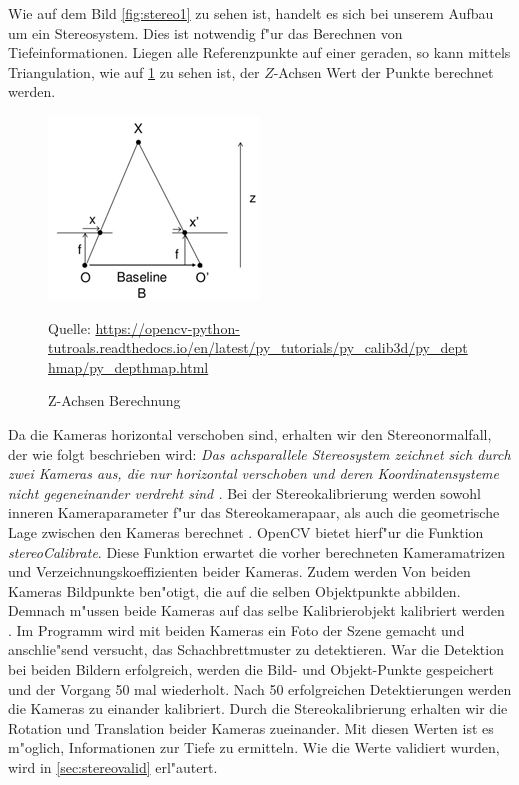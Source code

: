 Wie auf dem Bild \ref{fig:stereo1} zu sehen ist, handelt es sich bei unserem Aufbau um ein Stereosystem. Dies ist notwendig f"ur das Berechnen von Tiefeinformationen. Liegen alle Referenzpunkte auf einer geraden, so kann mittels Triangulation, wie auf \ref{fig:baseline} zu sehen ist, der $Z$-Achsen Wert der Punkte berechnet werden.

\begin{figure}[H]
	\includegraphics[scale=1.5]{bilder/baseline}
	\caption[Z-Achsen Berechnung]{Z-Achsen Berechnung}
	\label{fig:baseline}%
	\small Quelle: \url{https://opencv-python-tutroals.readthedocs.io/en/latest/py_tutorials/py_calib3d/py_depthmap/py_depthmap.html}
\end{figure}

\noindent Da die Kameras horizontal verschoben sind, erhalten wir den Stereonormalfall, der wie folgt beschrieben wird: \textit{Das achsparallele Stereosystem zeichnet sich durch zwei Kameras aus, die nur horizontal verschoben und deren Koordinatensysteme nicht gegeneinander verdreht sind \cite{Tu}.} \newline
\noindent Bei der Stereokalibrierung werden sowohl inneren Kameraparameter f"ur das Stereokamerapaar, als auch die geometrische Lage zwischen den Kameras berechnet \cite{zbs}. OpenCV bietet hierf"ur die Funktion \textit{stereoCalibrate}. Diese Funktion erwartet die vorher berechneten Kameramatrizen und Verzeichnungskoeffizienten beider Kameras. Zudem werden Von beiden Kameras Bildpunkte ben"otigt, die auf die selben Objektpunkte abbilden. Demnach m"ussen beide Kameras auf das selbe Kalibrierobjekt kalibriert werden \cite{ocvs}. Im Programm wird mit beiden Kameras ein Foto der Szene gemacht und anschlie"send versucht, das Schachbrettmuster zu detektieren. War die Detektion bei beiden Bildern erfolgreich, werden die Bild- und Objekt-Punkte gespeichert und der Vorgang 50 mal wiederholt. Nach 50 erfolgreichen Detektierungen werden die Kameras zu einander kalibriert.\newline
Durch die Stereokalibrierung erhalten wir die Rotation und Translation beider Kameras zueinander. Mit diesen Werten ist es m"oglich, Informationen zur Tiefe zu ermitteln. Wie die Werte validiert wurden, wird in \ref{sec:stereovalid} erl"autert.

